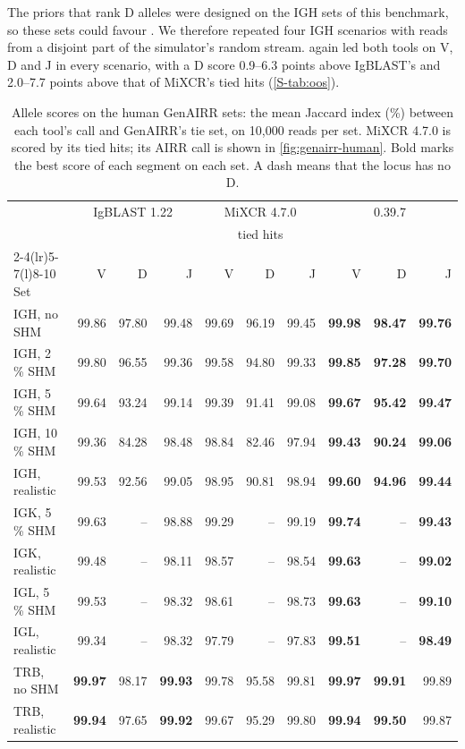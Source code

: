 \documentclass[11pt,a4paper]{article}
\begin{document}
The priors that rank D alleles were designed on the IGH sets of this
benchmark, so these sets could favour \swig. We therefore repeated four IGH
scenarios with reads from a disjoint part of the simulator's random stream.
\swig{} again led both tools on V, D and J in every scenario, with a D score
0.9--6.3 points above IgBLAST's and 2.0--7.7 points above that of MiXCR's
tied hits (\cref{S-tab:oos}).

\begin{table}[tbp]
\centering
\caption{Allele scores on the human GenAIRR sets: the mean Jaccard index
(\%) between each tool's call and GenAIRR's tie set, on 10,000 reads per
set. MiXCR 4.7.0 is scored by its tied hits; its AIRR call is shown in
\cref{fig:genairr-human}. Bold marks the best score of each segment on each
set. A dash means that the locus has no D.}
\label{tab:genairr-human}
\footnotesize
\setlength{\tabcolsep}{3.2pt}
\begin{tabular}{@{}l rrr rrr rrr@{}}
\toprule
 & \multicolumn{3}{c}{IgBLAST 1.22} & \multicolumn{3}{c}{MiXCR 4.7.0} & \multicolumn{3}{c}{\swig{} 0.39.7} \\
 & & & & \multicolumn{3}{c}{tied hits} & & & \\
\cmidrule(lr){2-4}\cmidrule(lr){5-7}\cmidrule(l){8-10}
Set & V & D & J & V & D & J & V & D & J \\
\midrule
IGH, no SHM      & 99.86 & 97.80 & 99.48 & 99.69 & 96.19 & 99.45 & \textbf{99.98} & \textbf{98.47} & \textbf{99.76} \\
IGH, 2\,\% SHM   & 99.80 & 96.55 & 99.36 & 99.58 & 94.80 & 99.33 & \textbf{99.85} & \textbf{97.28} & \textbf{99.70} \\
IGH, 5\,\% SHM   & 99.64 & 93.24 & 99.14 & 99.39 & 91.41 & 99.08 & \textbf{99.67} & \textbf{95.42} & \textbf{99.47} \\
IGH, 10\,\% SHM  & 99.36 & 84.28 & 98.48 & 98.84 & 82.46 & 97.94 & \textbf{99.43} & \textbf{90.24} & \textbf{99.06} \\
IGH, realistic   & 99.53 & 92.56 & 99.05 & 98.95 & 90.81 & 98.94 & \textbf{99.60} & \textbf{94.96} & \textbf{99.44} \\
IGK, 5\,\% SHM   & 99.63 & --    & 98.88 & 99.29 & --    & 99.19 & \textbf{99.74} & --    & \textbf{99.43} \\
IGK, realistic   & 99.48 & --    & 98.11 & 98.57 & --    & 98.54 & \textbf{99.63} & --    & \textbf{99.02} \\
IGL, 5\,\% SHM   & 99.53 & --    & 98.32 & 98.61 & --    & 98.73 & \textbf{99.63} & --    & \textbf{99.10} \\
IGL, realistic   & 99.34 & --    & 98.32 & 97.79 & --    & 97.83 & \textbf{99.51} & --    & \textbf{98.49} \\
TRB, no SHM      & \textbf{99.97} & 98.17 & \textbf{99.93} & 99.78 & 95.58 & 99.81 & \textbf{99.97} & \textbf{99.91} & 99.89 \\
TRB, realistic   & \textbf{99.94} & 97.65 & \textbf{99.92} & 99.67 & 95.29 & 99.80 & \textbf{99.94} & \textbf{99.50} & 99.87 \\
\bottomrule
\end{tabular}
\end{table}
\end{document}
